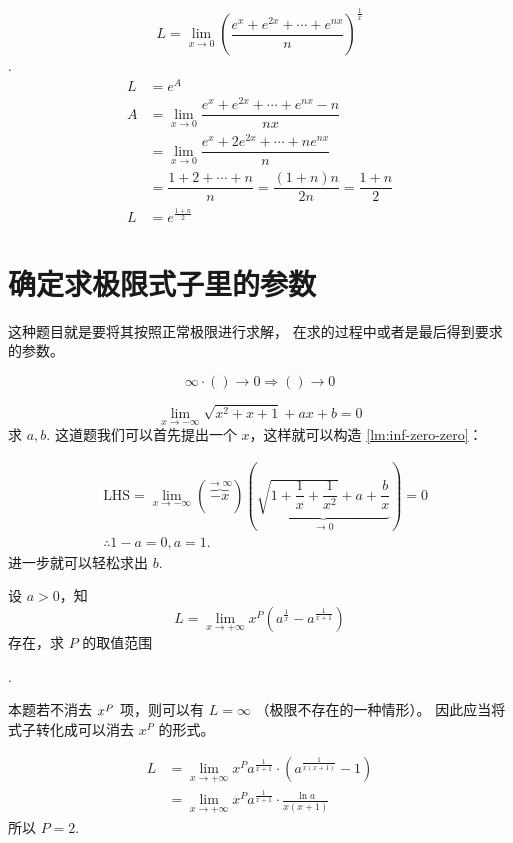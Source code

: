 \begin{example}
    \[
        L =\lim_{x \to 0} \left(
            \dfrac{
                e^x +e^{2x} +\cdots +e^{nx}
            }{n}
        \right)^{\frac{1}{x}}
    \]
    \cite[page 51, question 1]{yc}.
    \begin{align*}
        L &= e^A \\
        A &= \lim_{x \to 0} \dfrac{e^x +e^{2x} +\cdots +e^{nx} -n}{nx}\\
          &= \lim_{x \to 0} \dfrac{e^x +2e^{2x} +\cdots +ne^{nx}}{n}\\
          &= \dfrac{1 + 2 + \cdots + n }{n} = \dfrac{(1 +n)n}{2n} = \dfrac{1+n}{2}\\
        L &= e^{\frac{1+n}{2}}
    \end{align*}
\end{example}

\section{确定求极限式子里的参数}

这种题目就是要将其按照正常极限进行求解，
在求的过程中或者是最后得到要求的参数。

\begin{lemma} \label{lm:inf-zero-zero}
	\begin{equation}
		\infty \cdot () \to 0 \Rightarrow () \to 0
	\end{equation}

\end{lemma}

\begin{example}
    \[
        \lim_{x \to -\infty} \sqrt{x^2+x+1} +  ax + b = 0
    \]
    求 $a, b.$
    这道题我们可以首先提出一个 $x$，这样就可以构造 \ref{lm:inf-zero-zero}：

    \begin{align*}
        &\mbox{LHS} = \lim_{x \to -\infty} \left(\overbrace{-x}^{ \to \infty }\right)
        \left( 
        \underbrace{\sqrt{1+\dfrac{1}{x}+\dfrac{1}{x^2}} + a + \dfrac{b}{x}}_{\to 0}
        \right) = 0\\
        &\therefore 1-a = 0, a = 1.
    \end{align*}
    进一步就可以轻松求出 $b$.
\end{example}

\begin{example}
    设 $a > 0$，知
    \[
        L = \lim_{x \to +\infty} x^P \left(a^{\frac{1}{x}} - a^{\frac{1}{x+1}}\right)
    \]
    存在，求 $P$ 的取值范围

    \cite[page 2, question 4]{ll}.

    本题若不消去 $\cramped{x^P}$ 项，则可以有 $L = \infty$ （极限不存在的一种情形）。
    因此应当将式子转化成可以消去 $x^P$ 的形式。

    \begin{align*}
        L &= \lim_{x \to +\infty} x^P a^{\frac{1}{x + 1}} \cdot \left(a^{\frac{1}{x(x+1)}} - 1\right) \\
          &= \lim_{x \to +\infty} x^P a^{\frac{1}{x + 1}} \cdot \frac{\ln a}{x(x+1)}
    \end{align*}
    所以 $P = 2$.
\end{example}

